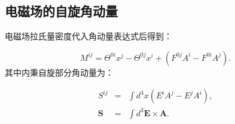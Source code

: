 \documentclass[10pt,UTF8]{ctexart}
\begin{document}
\subsection*{电磁场的自旋角动量}
\noindent
电磁场拉氏量密度代入角动量表达式后得到：

\begin{equation}
M^{ij}=\Theta^{0i}x^{j}-\Theta^{0j}x^{i}+\left(F^{0j}A^{i}-F^{0i}A^{j}\right).
\end{equation}
其中内秉自旋部分角动量为：

\begin{eqnarray}
S^{ij} & = & \int d^{3}x\left(E^{i}A^{j}-E^{j}A^{i}\right),\\
\bm{S} & = & \int d^{3}\bm{E}\times\bm{A}.
\end{eqnarray}
\end{document}
